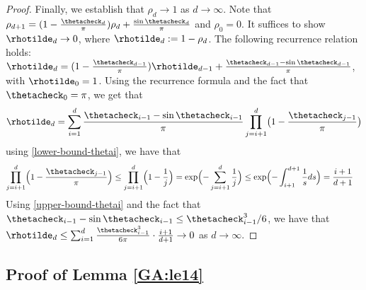 \begin{proof}
Finally, we establish that $\rho_d\to 1$ as $d \to \infty$.  Note that $\rho_{d+1} = (1 - \frac{\thetacheck_d}{\pi}) \rho_d + \frac{\sin \thetacheck_d}{\pi}$  and $\rho_0 = 0$.  It suffices to show $\rhotilde_d \to 0$, where $\rhotilde_d := 1 - \rho_d$.  The following recurrence relation holds: $\rhotilde_d = (1 - \frac{\thetacheck_{d-1}}{\pi}) \rhotilde_{d-1} + \frac{\thetacheck_{d-1} - \sin \thetacheck_{d-1}}{\pi}$, with $\rhotilde_0=1$.  Using the recurrence formula \cite[Eq.~(15)]{hand_global_2017}  and the fact that $\thetacheck_0=\pi$, we get that 
\begin{align}
\rhotilde_d =  \sum_{i=1}^d \frac{\thetacheck_{i-1} - \sin \thetacheck_{i-1}}{\pi} \prod_{j=i+1}^d \bigl(1 - \frac{\thetacheck_{j-1}}{\pi} \bigr)
\end{align}
using \eqref{lower-bound-thetai}, we have that
\begin{align*}
\prod_{j=i+1}^d \Bigl(1 - \frac{\thetacheck_{j-1}}{\pi} \Bigr) &\leq \prod_{j=i+1}^d \Bigl(1 - \frac{1}{j} \Bigr)
= \exp \Bigl( -\sum_{j = i+1}^d \frac{1}{j}  \Bigr) \leq \exp \Bigl( - \int_{i+1}^{d+1} \frac{1}{s} ds  \Bigr) = \frac{i+1}{d+1}
\end{align*}
Using \eqref{upper-bound-thetai} and the fact that $\thetacheck_{i-1} - \sin \thetacheck_{i-1} \leq \thetacheck_{i-1}^3 / 6$, we have that $\rhotilde_d \leq \sum_{i=1}^d \frac{\thetacheck_{i-1}^3}{6\pi}\cdot  \frac{i+1}{d+1} \to 0$ as $d \to \infty$. 


\end{proof}





\subsection{Proof of 
Lemma \ref{GA:le14}}

